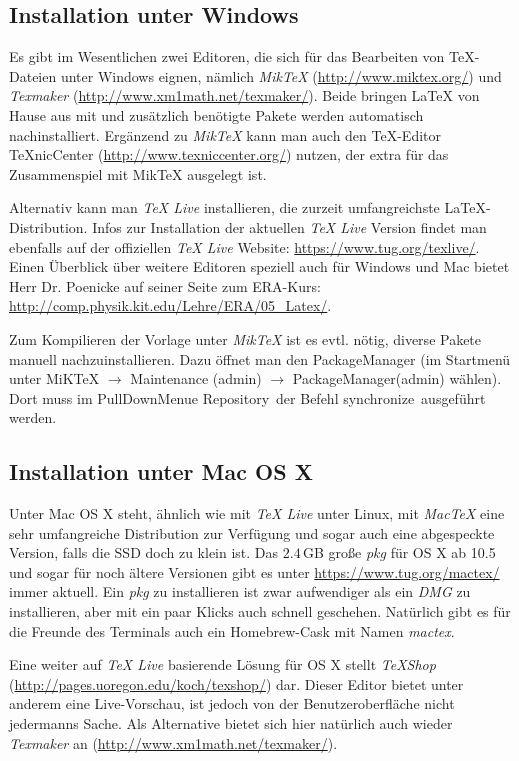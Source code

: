 \subsection{Installation unter Windows}
Es gibt im Wesentlichen zwei Editoren, die sich für das Bearbeiten von TeX-Dateien unter Windows eignen, nämlich \textit{MikTeX} (\url{http://www.miktex.org/}) und \textit{Texmaker} (\url{http://www.xm1math.net/texmaker/}). Beide bringen LaTeX von Hause aus mit und zusätzlich benötigte Pakete werden automatisch nachinstalliert. Ergänzend zu \textit{MikTeX} kann man auch den TeX-Editor TeXnicCenter (\url{http://www.texniccenter.org/}) nutzen, der extra für das Zusammenspiel mit MikTeX ausgelegt ist.

Alternativ kann man \textit{TeX Live} installieren, die zurzeit umfangreichste LaTeX-Distribution. Infos zur Installation der aktuellen \textit{TeX Live} Version findet man ebenfalls auf der offiziellen \textit{TeX Live} Website: \url{https://www.tug.org/texlive/}. Einen Überblick über weitere Editoren speziell auch für Windows und Mac bietet Herr Dr. Poenicke auf seiner Seite zum ERA-Kurs: \url{http://comp.physik.kit.edu/Lehre/ERA/05_Latex/}.

Zum Kompilieren der Vorlage unter \textit{MikTeX} ist es evtl. nötig, diverse Pakete manuell nachzuinstallieren. Dazu öffnet man den PackageManager (im Startmenü unter MiKTeX $\rightarrow$ Maintenance (admin) $\rightarrow$ PackageManager(admin) wählen). Dort muss im PullDownMenue \glqq Repository\grqq\ der Befehl \glqq synchronize\grqq\ ausgeführt werden.

\subsection{Installation unter Mac OS X}
Unter Mac OS X steht, ähnlich wie mit \textit{TeX Live} unter Linux, mit \textit{MacTeX} eine sehr umfangreiche Distribution zur Verfügung und sogar auch eine abgespeckte Version, falls die SSD doch zu klein ist. Das $2.4$\,GB große \textit{pkg} für OS X ab 10.5 und sogar für noch ältere Versionen gibt es unter \url{https://www.tug.org/mactex/} immer aktuell. Ein \textit{pkg} zu installieren ist zwar aufwendiger als ein \textit{DMG} zu installieren, aber mit ein paar Klicks auch schnell geschehen. Natürlich gibt es für die Freunde des Terminals auch ein Homebrew-Cask mit Namen \textit{mactex}.

Eine weiter auf \textit{TeX Live} basierende Lösung für OS X stellt \textit{TeXShop} (\url{http://pages.uoregon.edu/koch/texshop/}) dar. Dieser Editor bietet unter anderem eine Live-Vorschau, ist jedoch von der Benutzeroberfläche nicht jedermanns Sache. 
Als Alternative bietet sich hier natürlich auch wieder \textit{Texmaker} an (\url{http://www.xm1math.net/texmaker/}).


